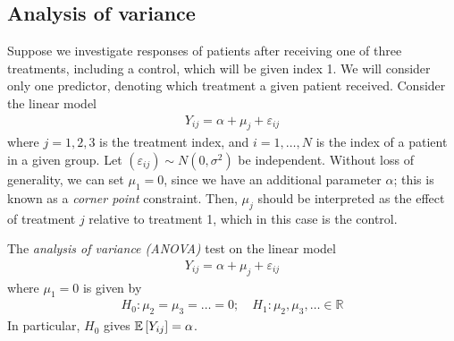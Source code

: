 \subsection{Analysis of variance}
Suppose we investigate responses of patients after receiving one of three treatments, including a control, which will be given index 1.
We will consider only one predictor, denoting which treatment a given patient received.
Consider the linear model
\begin{align*}
	Y_{ij} = \alpha + \mu_j + \varepsilon_{ij}
\end{align*}
where $j = 1, 2, 3$ is the treatment index, and $i = 1, \dots, N$ is the index of a patient in a given group.
Let $(\varepsilon_{ij}) \sim N(0, \sigma^2)$ be independent.
Without loss of generality, we can set $\mu_1 = 0$, since we have an additional parameter $\alpha$; this is known as a \textit{corner point} constraint.
Then, $\mu_j$ should be interpreted as the effect of treatment $j$ relative to treatment 1, which in this case is the control.

\begin{definition}
	The \textit{analysis of variance (ANOVA)} test on the linear model
	\begin{align*}
		Y_{ij} = \alpha + \mu_j + \varepsilon_{ij}
	\end{align*}
	where $\mu_1 = 0$ is given by
	\begin{align*}
		H_0 \colon \mu_2 = \mu_3 = \dots = 0;\quad H_1 \colon \mu_2, \mu_3, \dots \in \mathbb R
	\end{align*}
	In particular, $H_0$ gives $\mathbb{E}\left[{Y_{ij}}\right] = \alpha$.
\end{definition}

